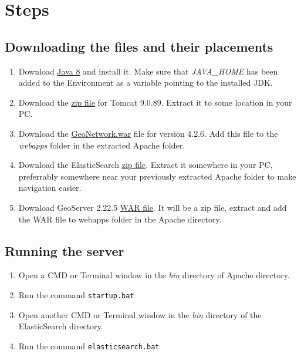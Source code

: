 \documentclass{article}
\begin{document}
    \section*{Steps}
        \subsection*{Downloading the files and their placements}
            \begin{enumerate}
                \item Download \href{https://www.oracle.com/java/technologies/javase/javase8u211-later-archive-downloads.html}{Java 8} and install it. Make sure that \textit{JAVA\_HOME} has been added to the Environment as a variable pointing to the installed JDK.
                \item Download the \href{https://dlcdn.apache.org/tomcat/tomcat-9/v9.0.89/bin/apache-tomcat-9.0.89.zip}{zip file} for Tomcat 9.0.89. Extract it to some location in your PC.
                \item Download the \href{https://sourceforge.net/projects/geonetwork/files/GeoNetwork_opensource/v4.2.6/geonetwork.war/download}{GeoNetwork.war} file for version 4.2.6. Add this file to the \emph{webapps} folder in the extracted Apache folder.
                \item Download the ElasticSearch \href{https://artifacts.elastic.co/downloads/elasticsearch/elasticsearch-7.17.15-windows-x86_64.zip}{zip file}. Extract it somewhere in your PC, preferrably somewhere near your previously extracted Apache folder to make navigation easier.
                \item Download GeoServer 2.22.5 \href{https://sourceforge.net/projects/geoserver/files/GeoServer/2.22.5/geoserver-2.22.5-war.zip}{WAR file}. It will be a zip file, extract and add the WAR file to webapps folder in the Apache directory.    
            \end{enumerate}
        \subsection*{Running the server}
            \begin{enumerate}
                \item Open a CMD or Terminal window in the \emph{bin} directory of Apache directory.
                \item Run the command \verb|startup.bat|
                \item Open another CMD or Terminal window in the \emph{bin} directory of the ElasticSearch directory.
                \item Run the command \verb|elasticsearch.bat|
            \end{enumerate}
\end{document}
